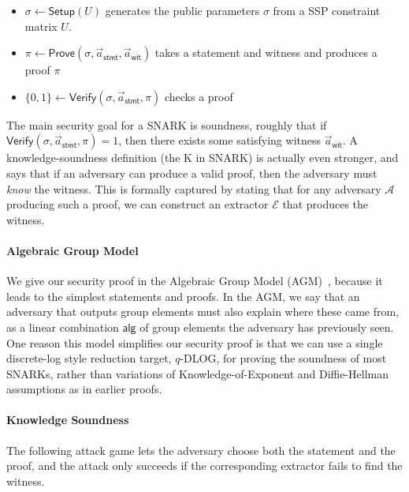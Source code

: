 \documentclass{article}
\theoremstyle{definition}
\theoremstyle{remark}
\newcommand{\Adv}{\mathcal{A}}
\newcommand{\Ext}{\mathcal{E}}
\begin{document}
\begin{itemize}
    \item $\sigma \leftarrow \textsf{Setup}(U)$ generates the public parameters $\sigma$ from a SSP constraint matrix $U$.
    \item $\pi \leftarrow \textsf{Prove}(\sigma, \vec{a}_{\textsf{stmt}}, \vec{a}_{\textsf{wit}})$ takes a statement and witness and produces a proof $\pi$
    \item $\{0,1\} \leftarrow \textsf{Verify}(\sigma, \vec{a}_{\textsf{stmt}}, \pi)$ checks a proof
\end{itemize}

The main security goal for a SNARK is soundness, roughly that if $\textsf{Verify}(\sigma,\vec{a}_{\textsf{stmt}},\pi)=1$, then there exists some satisfying witness $\vec{a}_\textsf{wit}$.
A knowledge-soundness definition (the K in SNARK) is actually even stronger, and says that if an adversary can produce a valid proof, then the adversary must \emph{know} the witness. This is formally captured by stating that for any adversary $\Adv$ producing such a proof, we can construct an extractor $\Ext$ that produces the witness.

\paragraph{Algebraic Group Model}
We give our security proof in the Algebraic Group Model (AGM)~\cite{fuchsbauer2018algebraic}, because it leads to the simplest statements and proofs.
In the AGM, we say that an adversary that outputs group elements must also explain where these came from, as a linear combination $\textsf{alg}$ of group elements the adversary has previously seen.
One reason this model simplifies our security proof is that we can use a single discrete-log style reduction target, $q$-DLOG, for proving the soundness of most SNARKs, rather than variations of Knowledge-of-Exponent and Diffie-Hellman assumptions as in earlier proofs.


\paragraph{Knowledge Soundness}
The following attack game lets the adversary choose both the statement and the proof, and the attack only succeeds if the corresponding extractor fails to find the witness.
\end{document}
